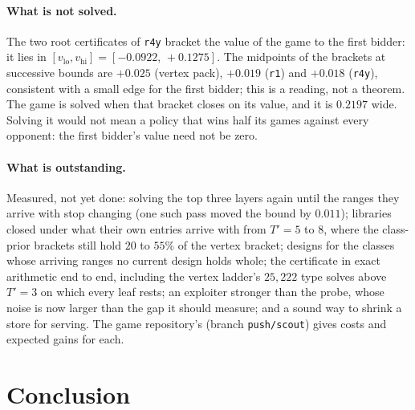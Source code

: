 \documentclass[11pt]{article}
\theoremstyle{plain}
\theoremstyle{definition}
\theoremstyle{remark}
\newcommand{\code}[1]{\texttt{\small #1}}
\begin{document}
\paragraph{What is not solved.} The two root certificates of
\code{r4y} bracket the value of the game to the first bidder: it lies
in $[v_{\mathrm{lo}},v_{\mathrm{hi}}]=[-0.0922,\,+0.1275]$. The
midpoints of the brackets at successive bounds are $+0.025$ (vertex
pack), $+0.019$ (\code{r1}) and $+0.018$ (\code{r4y}), consistent with
a small edge for the first bidder; this is a reading, not a theorem.
The game is solved when that bracket closes on its value, and it is
$0.2197$ wide. Solving it would not mean a policy that wins half its
games against every opponent: the first bidder's value need not be
zero.

\paragraph{What is outstanding.} Measured, not yet done: solving the
top three layers again until the ranges they arrive with stop changing
(one such pass moved the bound by $0.011$); libraries closed under what
their own entries arrive with from $T'=5$ to $8$, where the class-prior
brackets still hold $20$ to $55\%$ of the vertex bracket; designs for
the classes whose arriving ranges no current design holds whole; the
certificate in exact arithmetic end to end, including the vertex
ladder's $25{,}222$ type solves above $T'=3$ on which every leaf rests;
an exploiter stronger than the probe, whose noise is now larger than
the gap it should measure; and a sound way to shrink a store for
serving. The game repository's  (branch
\code{push/scout}) gives costs and expected gains for each.

\section{Conclusion}\label{sec:conclusion}
\end{document}
